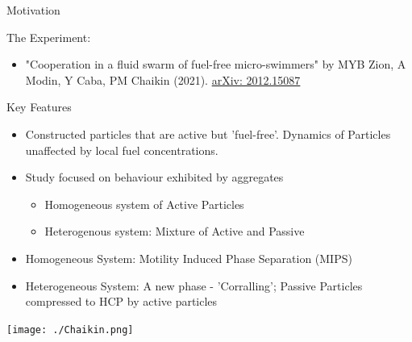 \documentclass[10pt]{beamer}
\begin{document}
\begin{frame}[label={sec:org8dbd5f6}]{Motivation}
\begin{block}{The Experiment:}
\begin{itemize}
\item "Cooperation in a fluid swarm of fuel-free micro-swimmers" by MYB Zion, A Modin, Y Caba, PM Chaikin (2021). \href{https://arxiv.org/abs/2012.15087}{arXiv: 2012.15087}
\end{itemize}
\end{block}
\begin{block}{Key Features}
\begin{itemize}
\item Constructed particles that are active but 'fuel-free'. Dynamics of Particles unaffected by local fuel concentrations.
\item Study focused on behaviour exhibited by aggregates
\begin{itemize}
\item Homogeneous system of Active Particles
\item Heterogenous system: Mixture of Active and Passive
\end{itemize}
\item Homogeneous System: Motility Induced Phase Separation (MIPS)
\item Heterogeneous System: A new phase - 'Corralling'; Passive Particles compressed to HCP by active particles
\end{itemize}
\end{block}
\end{frame}

\begin{frame}[label={sec:org969b0a9}]{}
\begin{center}
\texttt{[image: ./Chaikin.png]}
\end{center}
\end{frame}
\end{document}
